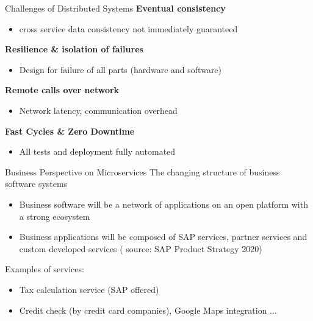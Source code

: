 \begin{frame}{Challenges of Distributed Systems}
\textbf{Eventual consistency}
	\begin{itemize}
	\item cross service data consistency not immediately guaranteed
	\end{itemize}

\textbf{Resilience \& isolation of failures}
	\begin{itemize}
	\item Design for failure of all parts (hardware and software)
	\end{itemize}

\textbf{Remote calls over network}
	\begin{itemize}
		\item Network latency, communication overhead
	\end{itemize}

\textbf{Fast Cycles \& Zero Downtime}
	\begin{itemize}
	\item All tests and deployment fully automated
	\end{itemize}
\end{frame}

\begin{frame}{Business Perspective on Microservices}
The changing structure of business software systems
\begin{itemize}
\item Business software will be a network of applications on an open platform with a strong ecosystem
\item Business applications will be composed of SAP services, partner services and custom developed services
(
 {source: SAP Product Strategy 2020})
\end{itemize}
\vfill
\begin{block}{Examples of services:}
	\begin{itemize}
	\item Tax calculation service (SAP offered)
	\item Credit check (by credit card companies), Google Maps integration ...
	\end{itemize}
\end{block}
\end{frame}

